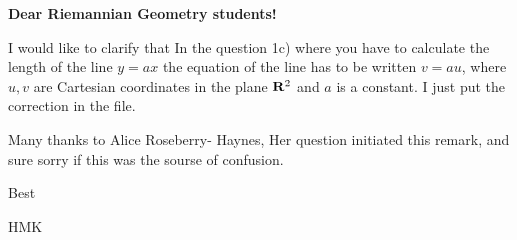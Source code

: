 

\baselineskip=17pt

 \centerline   {\bf   Dear Riemannian Geometry students!}

  I would like to clarify that 
  In the question 1c) where you have to calculate the length of the line
  $y=ax$
the equation of the line has to be written  
   $v=au$, where $u,v$ are Cartesian coordinates in the plane ${\bf R}^2$
and $a$ is a constant.  I just put the correction in the file.

   Many thanks to Alice Roseberry- Haynes, 
 Her question initiated this remark,
  and sure sorry if this was the sourse of confusion. 

     Best

            HMK


\bye 
